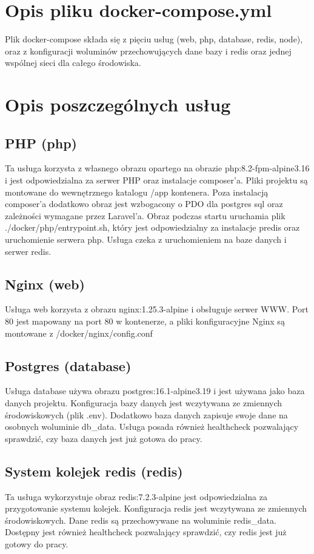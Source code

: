 \documentclass{article}
\begin{document}
\section{Opis pliku docker-compose.yml}
Plik docker-compose składa się z pięciu usług (web, php, database, redis, node), oraz z konfiguracji woluminów przechowujących dane bazy i redis oraz jednej wspólnej sieci dla całego środowiska.

\section{Opis poszczególnych usług}
\subsection{PHP (php)}
Ta usługa korzysta z własnego obrazu opartego na obrazie php:8.2-fpm-alpine3.16 i jest odpowiedzialna za serwer PHP oraz instalacje composer'a. Pliki projektu są montowane do wewnętrznego katalogu /app kontenera. Poza instalacją composer'a dodatkowo obraz jest wzbogacony o PDO dla postgres sql oraz zależności wymagane przez Laravel'a. Obraz podczas startu uruchamia plik ./docker/php/entrypoint.sh, który jest odpowiedzialny za instalacje predis oraz uruchomienie serwera php. Usługa czeka z uruchomieniem na baze danych i serwer redis.

\subsection{Nginx (web)}
Usługa web korzysta z obrazu nginx:1.25.3-alpine i obsługuje serwer WWW. Port 80 jest mapowany na port 80 w kontenerze, a pliki konfiguracyjne Nginx są montowane z /docker/nginx/config.conf

\subsection{Postgres (database)}
Usługa database używa obrazu postgres:16.1-alpine3.19 i jest używana jako baza danych projektu. Konfiguracja bazy danych jest wczytywana ze zmiennych środowiskowych (plik .env). Dodatkowo baza danych zapisuje swoje dane na osobnych woluminie db\_data. Usługa posada również healthcheck pozwalający sprawdzić, czy baza danych jest już gotowa do pracy.

\subsection{System kolejek redis (redis)}
Ta usługa wykorzystuje obraz redis:7.2.3-alpine jest odpowiedzialna za przygotowanie systemu kolejek. Konfiguracja redis jest wczytywana ze zmiennych środowiskowych. Dane redis są przechowywane na woluminie redis\_data. Dostępny jest również healthcheck pozwalający sprawdzić, czy redis jest już gotowy do pracy.
\end{document}
